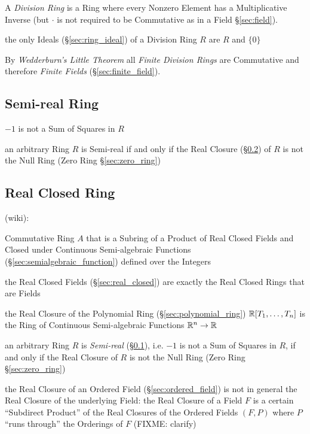 A \emph{Division Ring} is a Ring where every Nonzero Element has a
Multiplicative Inverse (but $\cdot$ is not required to be Commutative
as in a Field \S\ref{sec:field}).

the only Ideals (\S\ref{sec:ring_ideal}) of a Division Ring $R$ are $R$ and
$\{0\}$

By \emph{Wedderburn's Little Theorem} all \emph{Finite Division Rings}
are Commutative and therefore \emph{Finite Fields}
(\S\ref{sec:finite_field}).



\subsection{Semi-real Ring}\label{sec:semireal_ring}

$-1$ is not a Sum of Squares in $R$

an arbitrary Ring $R$ is Semi-real if and only if the Real Closure
(\S\ref{sec:real_closed_ring}) of $R$ is not the Null Ring
(Zero Ring \S\ref{sec:zero_ring})



\subsection{Real Closed Ring}\label{sec:real_closed_ring}

(wiki):

Commutative Ring $A$ that is a Subring of a Product of Real Closed Fields and
Closed under Continuous Semi-algebraic Functions
(\S\ref{sec:semialgebraic_function}) defined over the Integers

the Real Closed Fields (\S\ref{sec:real_closed}) are exactly the Real Closed
Rings that are Fields

the Real Closure of the Polynomial Ring (\S\ref{sec:polynomial_ring})
$\mathbb{R}[T_1,\ldots,T_n]$ is the Ring of Continuous Semi-algebraic Functions
$\mathbb{R}^n \rightarrow \mathbb{R}$

an arbitrary Ring $R$ is \emph{Semi-real} (\S\ref{sec:semireal_ring}), i.e.
$-1$ is not a Sum of Squares in $R$, if and only if the Real Closure of $R$ is
not the Null Ring (Zero Ring \S\ref{sec:zero_ring})

the Real Closure of an Ordered Field (\S\ref{sec:ordered_field}) is not in
general the Real Closure of the underlying Field: the Real Closure of a Field
$F$ is a certain ``Subdirect Product'' of the Real Closures of the Ordered
Fields $(F,P)$ where $P$ ``runs through'' the Orderings of $F$ (FIXME: clarify)

